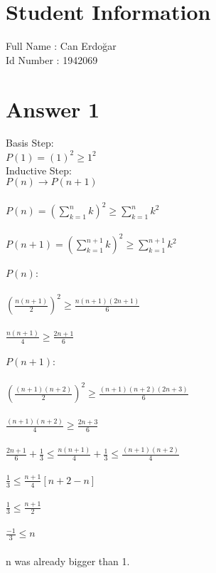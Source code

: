 \documentclass[12pt]{article}
\begin{document}
\section*{Student Information } 
Full Name :  Can Erdoğar \\
Id Number : 1942069  \\

\section*{Answer 1}
Basis Step: \\
$P(1)=(1)^{2} \geq 1^{2}$ \\
Inductive Step: \\
$P(n) \rightarrow P(n+1)$ \\ \\
$P(n) = (\sum\limits_{k=1}^n k)^{2} \geq \sum\limits_{k=1}^n k^{2}$ \\ \\
$P(n+1) = (\sum\limits_{k=1}^{n+1} k)^{2} \geq \sum\limits_{k=1}^{n+1} k^{2}$ \\ \\
$P(n):$ \\ \\
$(\frac{n(n+1)}{2})^2 \geq \frac{n(n+1)(2n+1)}{6}$ \\ \\
$\frac{n(n+1)}{4} \geq \frac{2n+1}{6}$ \\ \\
$P(n+1):$ \\ \\
$(\frac{(n+1)(n+2)}{2})^2 \geq \frac{(n+1)(n+2)(2n+3)}{6}$ \\ \\
$\frac{(n+1)(n+2)}{4} \geq \frac{2n+3}{6}$ \\ \\
$\frac{2n+1}{6} + \frac{1}{3} \leq \frac{n(n+1)}{4} + \frac{1}{3} \leq \frac{(n+1)(n+2)}{4}$ \\ \\
$\frac{1}{3} \leq \frac{n+1}{4} [n+2-n]$ \\ \\
$\frac{1}{3} \leq \frac{n+1}{2}$ \\ \\
$\frac{-1}{3} \leq n$ \\ \\
n was already bigger than 1. \\
\end{document}
